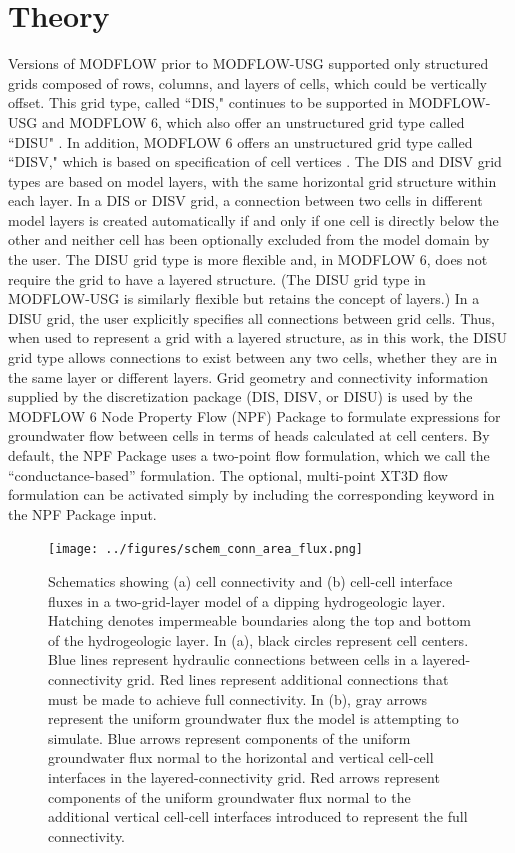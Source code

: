 \documentclass{article}
\begin{document}
\section*{Theory}

Versions of MODFLOW prior to MODFLOW-USG \citep{modflowusg} supported only structured grids composed of rows, columns, and layers of cells, which could be vertically offset. This grid type, called ``DIS," continues to be supported in MODFLOW-USG and MODFLOW 6, which also offer an unstructured grid type called ``DISU" \citep{modflowusg, modflow6gwf}. In addition, MODFLOW 6 offers an  unstructured grid type called ``DISV," which is based on specification of cell vertices \citep{modflow6gwf}. The DIS and DISV grid types are based on model layers, with the same horizontal grid structure within each layer. In a DIS or DISV grid, a connection between two cells in different model layers is created automatically if and only if one cell is directly below the other and neither cell has been optionally excluded from the model domain by the user. The DISU grid type is more flexible and, in MODFLOW 6, does not require the grid to have a layered structure. (The DISU grid type in MODFLOW-USG is similarly flexible but retains the concept of layers.) In a DISU grid, the user explicitly specifies all connections between grid cells. Thus, when used to represent a grid with a layered structure, as in this work, the DISU grid type allows connections to exist between any two cells, whether they are in the same layer or different layers. Grid geometry and connectivity information supplied by the discretization package (DIS, DISV, or DISU) is used by the MODFLOW 6 Node Property Flow (NPF) Package to formulate expressions for groundwater flow between cells in terms of heads calculated at cell centers. By default, the NPF Package uses a two-point flow formulation, which we call the ``conductance-based'' formulation. The optional, multi-point XT3D flow formulation can be activated simply by including the corresponding keyword in the NPF Package input.

\begin{figure}
	\begin{center}
	\texttt{[image: ../figures/schem\_conn\_area\_flux.png]}
	\caption{Schematics showing (a) cell connectivity and (b) cell-cell interface fluxes in a two-grid-layer model of a dipping hydrogeologic layer. Hatching denotes impermeable boundaries along the top and bottom of the hydrogeologic layer. In (a), black circles represent cell centers. Blue lines represent hydraulic connections between cells in a layered-connectivity grid. Red lines represent additional connections that must be made to achieve full connectivity. In (b), gray arrows represent the uniform groundwater flux the model is attempting to simulate. Blue arrows represent components of the uniform groundwater flux normal to the horizontal and vertical cell-cell interfaces in the layered-connectivity grid. Red arrows represent components of the uniform groundwater flux normal to the additional vertical cell-cell interfaces introduced to represent the full connectivity.}
	\label{fig:schem-conn-area-flux}
	\end{center}
\end{figure}
\end{document}
